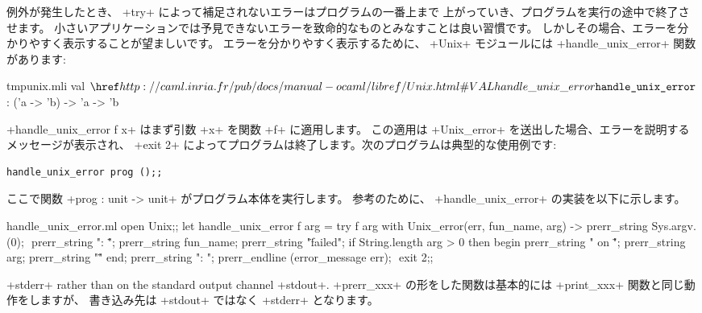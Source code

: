 例外が発生したとき、 \ml+try+ によって補足されないエラーはプログラムの一番上まで
上がっていき、プログラムを実行の途中で終了させます。
小さいアプリケーションでは予見できないエラーを致命的なものとみなすことは良い習慣です。
しかしその場合、エラーを分かりやすく表示することが望ましいです。
エラーを分かりやすく表示するために、 \ml+Unix+ モジュールには \ml+handle_unix_error+ 関数があります:
%
\begin{listingcodefile}{tmpunix.mli}
val $\indexlibvalue{Unix}{handle\_unix\_error}$ : ('a -> 'b) -> 'a -> 'b
\end{listingcodefile}
%
\ml+handle_unix_error f x+ はまず引数 \ml+x+ を関数 \ml+f+ に適用します。
この適用は \ml+Unix_error+ を送出した場合、エラーを説明するメッセージが表示され、
\ml+exit 2+ によってプログラムは終了します。次のプログラムは典型的な使用例です:
%
\begin{lstlisting}
handle_unix_error prog ();;
\end{lstlisting}
%
ここで関数 \ml+prog : unit -> unit+ がプログラム本体を実行します。
参考のために、 \ml+handle_unix_error+ の実装を以下に示します。
%
\begin{listingcodefile}[style=numbers]{handle_unix_error.ml}
open Unix;;
let handle_unix_error f arg =
  try
    f arg
  with Unix_error(err, fun_name, arg) ->
    prerr_string Sys.argv.(0); $\label{prog:argv}$
    prerr_string ": \"";
    prerr_string fun_name;
    prerr_string "\" failed";
    if String.length arg > 0 then begin
      prerr_string " on \"";
      prerr_string arg;
      prerr_string "\""
    end;
    prerr_string ": ";
    prerr_endline (error_message err); $\label{prog:errmsg}$
    exit 2;;
\end{listingcodefile}
%
\ml+stderr+ rather than on the standard output channel \ml+stdout+.
\ml+prerr_xxx+ の形をした関数は基本的には \ml+print_xxx+ 関数と同じ動作をしますが、
書き込み先は \ml+stdout+ ではなく \ml+stderr+ となります。

